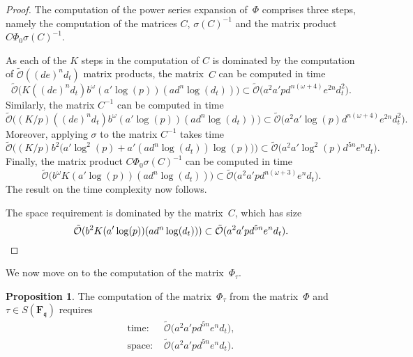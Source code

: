 \documentclass[a4paper,11pt]{article}
\numberwithin{equation}{section}
\newcommand{\FF}{\mathbf{F}} %
\providecommand{\SoftOh}{\tilde{\mathcal{O}}} %
\theoremstyle{definition}
\newtheorem{prop}[thm]{Proposition}
\begin{document}
\begin{proof}
The computation of the power series expansion of~$\Phi$ comprises 
three steps, namely the computation of the matrices $C$, $\sigma(C)^{-1}$ 
and the matrix product $C \Phi_0 \sigma(C)^{-1}$.

As each of the $K$ steps in the computation of $C$ is dominated by the 
computation of $\SoftOh((de)^n d_t)$ matrix products, the matrix~$C$ can be 
computed in time 
\begin{equation*}
\SoftOh\bigl(K ((de)^n d_t) b^{\omega} (a' \log (p)) (a d^n \log (d_t))\bigr) 
    \subset \SoftOh\bigl(a^2 a' p d^{n(\omega + 4)} e^{2n} d_t^2 \bigr).
\end{equation*}
Similarly, the matrix $C^{-1}$ can be computed in time 
\begin{equation*}
\SoftOh\bigl( (K/p) ((de)^n d_t) b^{\omega} (a' \log (p)) (ad^n \log (d_t)) \bigr)
    \subset \SoftOh\bigl( a^2 a' \log(p) d^{n(\omega+4)} e^{2n} d_t^2 \bigr). 
\end{equation*}
Moreover, applying $\sigma$ to the matrix $C^{-1}$ takes time 
\begin{equation*}
\SoftOh\bigl( (K/p) b^2 \bigl(a' \log^2(p) + a' (a d^n \log(d_t)) \log(p) \bigl) \bigr)
\subset \SoftOh\bigl( a^2 a' \log^2(p) d^{5n} e^n d_t \bigr).
\end{equation*}
Finally, the matrix product 
$C \Phi_0 \sigma(C)^{-1}$ can be computed in time 
\begin{equation*}
\SoftOh\bigl( b^{\omega} K (a' \log(p)) (a d^n \log(d_t)) \bigr) 
    \subset \SoftOh\bigl( a^2 a' p d^{n(\omega + 3)} e^n d_t \bigr).
\end{equation*}
The result on the time complexity now follows.

The space requirement is dominated by the matrix~$C$, which has size
\begin{equation*}
\SoftOh(b^2 K (a' \log(p)) (a d^n \log(d_t))) \subset 
    \SoftOh(a^2 a' p d^{5n} e^n d_t). \qedhere
\end{equation*}
\end{proof}

We now move on to the computation of the matrix~$\Phi_{\tau}$.

\begin{prop}
The computation of the matrix~$\Phi_{\tau}$ from the matrix~$\Phi$ 
and $\tau \in S(\FF_{\mathfrak{q}})$ requires
\begin{align*}
\mbox{time: }  &\SoftOh\bigl(a^2 a' p d^{5n} e^n d_t \bigr), \\ 
\mbox{space: } &\SoftOh\bigl(a^2 a' p d^{5n} e^n d_t \bigr).
\end{align*}
\end{prop}
\end{document}
